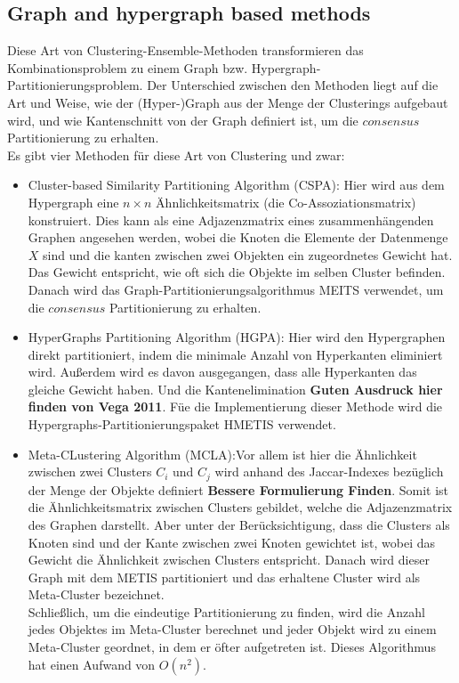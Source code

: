 \documentclass[runningheads]{llncs}
\begin{document}
\subsection{Graph and hypergraph based methods}
Diese Art von Clustering-Ensemble-Methoden transformieren das Kombinationsproblem zu einem Graph bzw. Hypergraph-Partitionierungsproblem. Der Unterschied zwischen den Methoden liegt auf die Art und Weise, wie der (Hyper-)Graph aus der Menge der Clusterings aufgebaut wird, und wie Kantenschnitt von der Graph definiert ist, um die $consensus$ Partitionierung zu erhalten.\\
Es gibt vier Methoden für diese Art von Clustering und zwar: 
\begin{itemize}
	\item Cluster-based Similarity Partitioning Algorithm (CSPA): Hier wird aus dem Hypergraph eine $n \times n$ Ähnlichkeitsmatrix (die Co-Assoziationsmatrix) konstruiert. Dies kann als eine Adjazenzmatrix eines zusammenhängenden Graphen angesehen werden, wobei die Knoten die Elemente der Datenmenge $X$ sind und die kanten zwischen zwei Objekten ein zugeordnetes Gewicht hat. Das Gewicht entspricht, wie oft sich die Objekte im selben Cluster befinden. Danach wird das Graph-Partitionierungsalgorithmus MEITS verwendet, um die $consensus$ Partitionierung zu erhalten.\\[4pt]
	
	\item HyperGraphs Partitioning Algorithm (HGPA): Hier wird den Hypergraphen direkt partitioniert, indem die minimale Anzahl  von Hyperkanten eliminiert wird. Außerdem wird es davon ausgegangen, dass alle Hyperkanten das gleiche Gewicht haben. Und die Kantenelimination \textbf{Guten Ausdruck hier finden von Vega 2011}. Füe die Implementierung dieser Methode wird die Hypergraphs-Partitionierungspaket HMETIS verwendet.\\[4pt]
	
	\item  Meta-CLustering Algorithm (MCLA):Vor allem ist hier die Ähnlichkeit zwischen zwei Clusters $C_{i}$ und $C_{j}$ wird anhand des Jaccar-Indexes bezüglich der Menge der Objekte definiert \textbf{Bessere Formulierung Finden}. Somit ist die Ähnlichkeitsmatrix zwischen Clusters gebildet, welche die Adjazenzmatrix des Graphen darstellt. Aber unter der Berücksichtigung, dass die Clusters als Knoten sind und der Kante zwischen zwei Knoten gewichtet ist, wobei das Gewicht die Ähnlichkeit zwischen Clusters entspricht. Danach wird dieser Graph mit dem METIS partitioniert und das erhaltene Cluster wird als Meta-Cluster bezeichnet.\\
	Schließlich, um die eindeutige Partitionierung zu finden, wird die Anzahl jedes Objektes im Meta-Cluster berechnet und jeder Objekt wird zu einem Meta-Cluster geordnet, in dem er öfter aufgetreten ist. Dieses Algorithmus hat einen Aufwand von $O(n^2)$.\\[4pt]
	      

\end{itemize}
\end{document}
